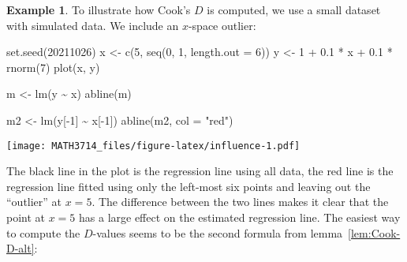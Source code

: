 \documentclass[
  a4paper,
]{article}
\newenvironment{Shaded}{\begin{snugshade}}{\end{snugshade}}
\newcommand{\AttributeTok}[1]{\textcolor[rgb]{0.77,0.63,0.00}{#1}}
\newcommand{\DecValTok}[1]{\textcolor[rgb]{0.00,0.00,0.81}{#1}}
\newcommand{\FloatTok}[1]{\textcolor[rgb]{0.00,0.00,0.81}{#1}}
\newcommand{\FunctionTok}[1]{\textcolor[rgb]{0.00,0.00,0.00}{#1}}
\newcommand{\NormalTok}[1]{#1}
\newcommand{\OtherTok}[1]{\textcolor[rgb]{0.56,0.35,0.01}{#1}}
\newcommand{\SpecialCharTok}[1]{\textcolor[rgb]{0.00,0.00,0.00}{#1}}
\newcommand{\StringTok}[1]{\textcolor[rgb]{0.31,0.60,0.02}{#1}}
\theoremstyle{definition}
\theoremstyle{definition}
\newtheorem{example}{Example}[section]
\theoremstyle{definition}
\theoremstyle{definition}
\theoremstyle{remark}
\begin{document}
\begin{example}
To illustrate how Cook's \(D\) is computed, we use a small dataset with
simulated data. We include an \(x\)-space outlier:

\begin{Shaded}
\begin{Highlighting}[]
\FunctionTok{set.seed}\NormalTok{(}\DecValTok{20211026}\NormalTok{)}
\NormalTok{x }\OtherTok{\textless{}{-}} \FunctionTok{c}\NormalTok{(}\DecValTok{5}\NormalTok{, }\FunctionTok{seq}\NormalTok{(}\DecValTok{0}\NormalTok{, }\DecValTok{1}\NormalTok{, }\AttributeTok{length.out =} \DecValTok{6}\NormalTok{))}
\NormalTok{y }\OtherTok{\textless{}{-}} \DecValTok{1} \SpecialCharTok{+} \FloatTok{0.1} \SpecialCharTok{*}\NormalTok{ x }\SpecialCharTok{+} \FloatTok{0.1} \SpecialCharTok{*} \FunctionTok{rnorm}\NormalTok{(}\DecValTok{7}\NormalTok{)}
\FunctionTok{plot}\NormalTok{(x, y)}

\NormalTok{m }\OtherTok{\textless{}{-}} \FunctionTok{lm}\NormalTok{(y }\SpecialCharTok{\textasciitilde{}}\NormalTok{ x)}
\FunctionTok{abline}\NormalTok{(m)}

\NormalTok{m2 }\OtherTok{\textless{}{-}} \FunctionTok{lm}\NormalTok{(y[}\SpecialCharTok{{-}}\DecValTok{1}\NormalTok{] }\SpecialCharTok{\textasciitilde{}}\NormalTok{ x[}\SpecialCharTok{{-}}\DecValTok{1}\NormalTok{])}
\FunctionTok{abline}\NormalTok{(m2, }\AttributeTok{col =} \StringTok{"red"}\NormalTok{)}
\end{Highlighting}
\end{Shaded}

\texttt{[image: MATH3714\_files/figure-latex/influence-1.pdf]}

The black line in the plot is the regression line using all data,
the red line is the regression line fitted using only the left-most
six points and leaving out the ``outlier'' at \(x=5\). The difference
between the two lines makes it clear that the point at \(x=5\) has a
large effect on the estimated regression line. The easiest way
to compute the \(D\)-values seems to be the second formula from
lemma~\ref{lem:Cook-D-alt}:

\begin{Shaded}
\end{Shaded}


\end{example}
\end{document}
